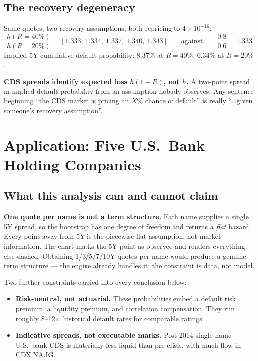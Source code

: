 \documentclass[11pt,a4paper]{article}
\newcommand{\keypoint}[1]{%
  \par\vspace{0.4em}\noindent
  \colorbox{codebg}{\parbox{\dimexpr\linewidth-2\fboxsep}{\small #1}}%
  \par\vspace{0.5em}}
\begin{document}
\subsection{The recovery degeneracy}

Same quotes, two recovery assumptions, both repricing to $4\times10^{-16}$:
\[
\frac{h(R=40\%)}{h(R=20\%)} = [1.333,\ 1.334,\ 1.337,\ 1.340,\ 1.343]
\qquad\text{against}\qquad \frac{0.8}{0.6} = 1.333
\]
Implied 5Y cumulative default probability: 8.37\% at $R=40\%$, 6.34\% at $R=20\%$.

\keypoint{\textbf{CDS spreads identify expected loss $h(1-R)$, not $h$.} A two-point spread in
implied default probability from an assumption nobody observes. Any sentence beginning ``the
CDS market is pricing an $X\%$ chance of default'' is really ``\dots given someone's recovery
assumption''.}

\newpage
\section{Application: Five U.S.\ Bank Holding Companies}

\subsection{What this analysis can and cannot claim}

\keypoint{\textbf{One quote per name is not a term structure.} Each name supplies a single 5Y
spread, so the bootstrap has one degree of freedom and returns a \emph{flat} hazard. Every
point away from 5Y is the piecewise-flat assumption, not market information. The chart marks
the 5Y point as observed and renders everything else dashed. Obtaining 1/3/5/7/10Y quotes per
name would produce a genuine term structure --- the engine already handles it; the constraint is
data, not model.}

Two further constraints carried into every conclusion below:

\begin{itemize}[leftmargin=1.4em,itemsep=0.15em]
\item \textbf{Risk-neutral, not actuarial.} These probabilities embed a default risk premium,
a liquidity premium, and correlation compensation. They run roughly 8--12$\times$ historical
default rates for comparable ratings.
\item \textbf{Indicative spreads, not executable marks.} Post-2014 single-name U.S.\ bank CDS
is materially less liquid than pre-crisis, with much flow in CDX.NA.IG.
\end{itemize}
\end{document}
